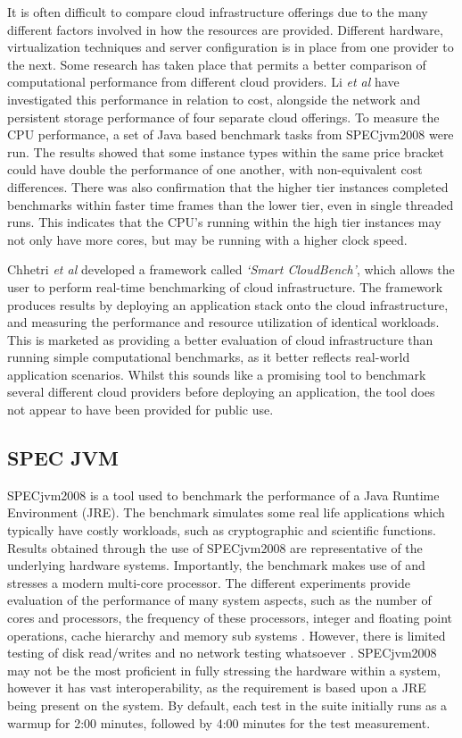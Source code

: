 \documentclass{llncs}
\begin{document}
It is often difficult to compare cloud infrastructure offerings due to the many different factors involved in how the resources are provided. Different hardware, virtualization techniques and server configuration is in place from one provider to the next\cite{chhetri2013smart}. Some research has taken place that permits a better comparison of computational performance from different cloud providers. Li \textit{et al}\cite{li2010cloudcmp} have investigated this performance in relation to cost, alongside the network and persistent storage performance of four separate cloud offerings. To measure the CPU performance, a set of Java based benchmark tasks from SPECjvm2008 were run. The results showed that some instance types within the same price bracket could have double the performance of one another, with non-equivalent cost differences. There was also confirmation that the higher tier instances completed benchmarks within faster time frames than the lower tier, even in single threaded runs. This indicates that the CPU's running within the high tier instances may not only have more cores, but may be running with a higher clock speed.

Chhetri \textit{et al}\cite{chhetri2013smart} developed a framework called \textit{`Smart CloudBench'}, which allows the user to perform real-time benchmarking of cloud infrastructure. The framework produces results by deploying an application stack onto the cloud infrastructure, and measuring the performance and resource utilization of identical workloads. This is marketed as providing a better evaluation of cloud infrastructure than running simple computational benchmarks, as it better reflects real-world application scenarios. Whilst this sounds like a promising tool to benchmark several different cloud providers before deploying an application, the tool does not appear to have been provided for public use.

\subsection{SPEC JVM}

SPECjvm2008 is a tool used to benchmark the performance of a Java Runtime Environment (JRE). The benchmark simulates some real life applications which typically have costly workloads, such as cryptographic and scientific functions. Results obtained through the use of SPECjvm2008 are representative of the underlying hardware systems. Importantly, the benchmark makes use of and stresses a modern multi-core processor. The different experiments provide evaluation of the performance of many system aspects, such as the number of cores and processors, the frequency of these processors, integer and floating point operations, cache hierarchy and memory sub systems \cite{shiv2009specjvm2008}. However, there is limited testing of disk read/writes and no network testing whatsoever \cite{specjvm}. SPECjvm2008 may not be the most proficient in fully stressing the hardware within a system, however it has vast interoperability, as the requirement is based upon a JRE being present on the system. By default, each test in the suite initially runs as a warmup for 2:00 minutes, followed by 4:00 minutes for the test measurement.
\end{document}
